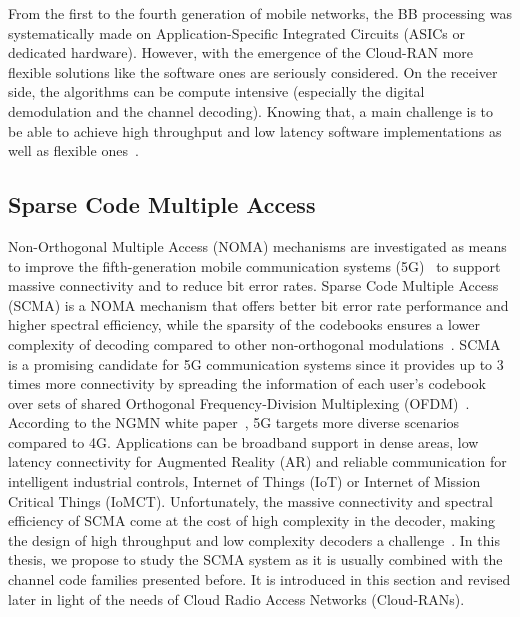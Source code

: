 From the first to the fourth generation of mobile networks, the BB processing
was systematically made on Application-Specific Integrated Circuits (ASICs or
dedicated hardware). However, with the emergence of the Cloud-RAN more flexible
solutions like the software ones are seriously considered. On the receiver side,
the algorithms can be compute intensive (especially the digital demodulation and
the channel decoding). Knowing that, a main challenge is to be able to achieve
high throughput and low latency software implementations as well as flexible
ones~\cite{Nikaein2015,Rodriguez2017}.

\subsection{Sparse Code Multiple Access}
\label{sec:ctx_scma}


Non-Orthogonal Multiple Access (NOMA) mechanisms are investigated as means to
improve the fifth-generation mobile communication systems (5G)~\cite{Islam2017}
to support massive connectivity and to reduce bit error rates. Sparse Code
Multiple Access (SCMA) is a NOMA mechanism that offers better bit error rate
performance and higher spectral efficiency, while the sparsity of the codebooks
ensures a lower complexity of decoding compared to other non-orthogonal
modulations~\cite{Nikopour2013}. SCMA is a promising candidate for 5G
communication systems since it provides up to 3 times more connectivity by
spreading the information of each user's codebook over sets of shared Orthogonal
Frequency-Division Multiplexing (OFDM)~\cite{Altera2015}. According to the NGMN
white paper~\cite{Alliance2015}, 5G targets more diverse scenarios compared to
4G. Applications can be broadband support in dense areas, low latency
connectivity for Augmented Reality (AR) and reliable communication for
intelligent industrial controls, Internet of Things (IoT) or Internet of Mission
Critical Things (IoMCT). Unfortunately, the massive connectivity and spectral
efficiency of SCMA come at the cost of high complexity in the decoder, making
the design of high throughput and low complexity decoders a
challenge~\cite{Lu2015}. In this thesis, we propose to study the SCMA system
as it is usually combined with the channel code families presented before.
It is introduced in this section and revised later in light of the needs of
Cloud Radio Access Networks (Cloud-RANs).

